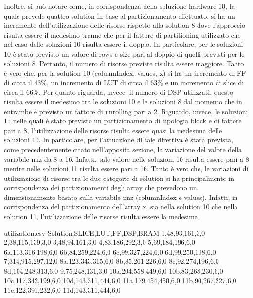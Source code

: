 Inoltre, si può notare come, in corrispondenza della soluzione hardware 10, la quale prevede quattro solution in base al partizionamento effettuato, si ha un incremento dell'utilizzazione delle risorse rispetto alla solution 8 dove l'approccio risulta essere il medesimo tranne che per il fattore di partitioning utilizzato che nel caso delle soluzioni 10 risulta essere il doppio. In particolare, per le soluzioni 10 è stato previsto un valore di rows e size pari al doppio di quelli previsti per le soluzioni 8. Pertanto, il numero di risorse previste risulta essere maggiore. Tanto è vero che, per la solution 10 (columnIndex, values, x) si ha un incremento di FF di circa il $43\%$, un incremento di LUT di circa il $63\%$ e un incremento di slice di circa il $66\%$. Per quanto riguarda, invece, il numero di DSP utilizzati, questo risulta essere il medesimo tra le soluzioni 10 e le soluzioni 8 dal momento che in entrambe è previsto un fattore di unrolling pari a 2. Riguardo, invece, le soluzioni 11 nelle quali è stato previsto un partizionamento di tipologia block e di fattore pari a 8, l'utilizzazione delle risorse risulta essere quasi la medesima delle soluzioni 10. In particolare, per l'attuazione di tale direttiva è stata prevista, come precedentemente citato nell'apposita sezione, la variazione del valore della variabile nnz da 8 a 16. Infatti, tale valore nelle soluzioni 10 risulta essere pari a 8 mentre nelle soluzioni 11 risulta essere pari a 16. Tanto è vero che, le variazioni di utilizzazione di risorse tra le due categorie di solution si ha principalmente in corrispondenza dei partizionamenti degli array che prevedono un dimensionamento basato sulla variabile nnz (columnIndex e values). Infatti, in corrispondenza del partizionamento dell'array x, sia nella solution 10 che nella solution 11, l'utilizzazione delle risorse risulta essere la medesima.



\begin{filecontents}{utilization.csv}
	Solution,SLICE,LUT,FF,DSP,BRAM
	1,48,93,161,3,0
	2,38,115,139,3,0
	3,48,94,161,3,0
	4,83,186,292,3,0
	5,69,184,196,6,0
	6a,113,316,198,6,0
	6b,84,259,224,6,0
	6c,99,327,224,6,0
	6d,99,250,198,6,0
	7,314,915,297,12,0
	8a,123,343,315,6,0
	8b,85,261,226,6,0
	8c,92,274,196,6,0
	8d,104,248,313,6,0
	9,75,248,131,3,0
	10a,204,558,449,6,0
	10b,83,268,230,6,0
	10c,117,342,199,6,0
	10d,143,311,444,6,0
	11a,179,454,450,6,0
	11b,90,267,227,6,0
	11c,122,391,232,6,0
	11d,143,311,444,6,0
\end{filecontents}

